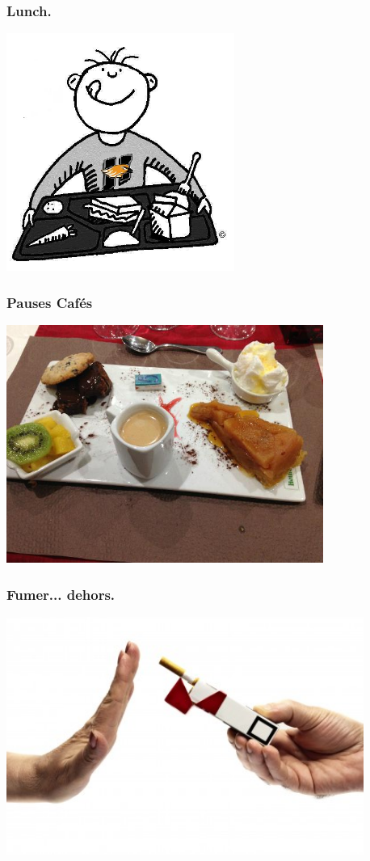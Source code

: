 \documentclass{beamer}
\begin{document}
\begin{frame}[fragile]
  \frametitle{Lunch.}

  \begin{center}
    \includegraphics[height=21em]{lunch_guy.JPG}
  \end{center}
\end{frame}

\begin{frame}[fragile]
  \frametitle{Pauses Cafés}

  \begin{center}
    \includegraphics[height=21em]{la-pause-gourmande.jpg}
  \end{center}
\end{frame}

\begin{frame}[fragile]
  \frametitle{Fumer... dehors.}

  \begin{center}
    \includegraphics[height=21em]{cigarette.jpg}
  \end{center}
\end{frame}
\end{document}
